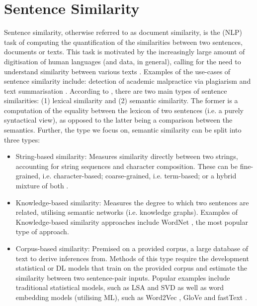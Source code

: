 \documentclass[10pt,oneside]{report}
\begin{document}
\section{Sentence Similarity}\label{sec:sentenceSimilarity}
Sentence similarity, otherwise referred to as document similarity, is the (NLP) task of computing the quantification of the similarities between two sentences, documents or texts. This task is motivated by the increasingly large amount of digitisation of human languages (and data, in general), calling for the need to understand similarity between various texts \cite{raju2022sentence}. Examples of the use-cases of sentence similarity include: detection of academic malpractice via plagiarism \cite{lukashenko2007computer, baba2017plagiarism} and text summarisation \cite {aliguliyev2009new, kumar2020semantic, jo2017k}. According to \cite{raju2022sentence}, there are two main types of sentence similarities: (1) lexical similarity and (2) semantic similarity. The former is a computation of the equality between the lexicon of two sentences (i.e. a purely syntactical view), as opposed to the latter  being a comparison between the semantics. Further, the type we focus on, semantic similarity can be split into three types: 

\begin{itemize}
    \item String-based similarity: Measures similarity directly between two strings, accounting for string sequences and character composition. These can be fine-grained, i.e. character-based; coarse-grained, i.e. term-based; or a hybrid mixture of both \cite{yu2016string}.
    \item Knowledge-based similarity: Measures the degree to which two sentences are related, utilising semantic networks (i.e. knowledge graphs). Examples of Knowledge-based similarity approaches include WordNet \cite{budanitsky2001semantic}, the most popular type of approach.
    \item Corpus-based similarity: Premised on a provided corpus, a large database of text to derive inferences from. Methods of this type require the development statistical or DL models that train on the provided corpus and estimate the similarity between two sentence-pair inputs. Popular examples include traditional statistical models, such as LSA \cite{landauer1998introduction} and SVD \cite{steinberger2005text} as well as word embedding models (utilising ML), such as Word2Vec \cite{bojanowski2017enriching}, GloVe \cite{pennington2014glove} and fastText \cite{mikolov2013efficient}.
\end{itemize}
\end{document}
